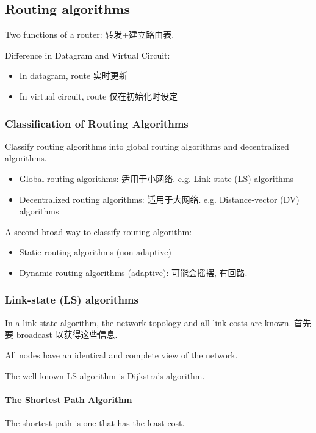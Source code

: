 \subsection{Routing algorithms}
Two functions of a router: 转发+建立路由表. 

Difference in Datagram and Virtual Circuit:
\begin{itemize}
    \item In datagram, route 实时更新
    \item In virtual circuit, route  仅在初始化时设定
\end{itemize}

\subsubsection{Classification of Routing Algorithms}
Classify routing algorithms into global routing algorithms and decentralized algorithms.
\begin{itemize}
    \item Global routing algorithms: 适用于小网络. e.g. Link-state (LS) algorithms
    \item Decentralized routing algorithms: 适用于大网络. e.g. Distance-vector (DV) algorithms
\end{itemize}

A second broad way to classify routing algorithm:
\begin{itemize}
    \item Static routing algorithms (non-adaptive)
    \item Dynamic routing algorithms (adaptive): 可能会摇摆, 有回路. 
\end{itemize}


\subsubsection{Link-state (LS) algorithms}
In a link-state algorithm, the network topology and all link costs
are known. 首先要 broadcast 以获得这些信息. 

All nodes have an identical and complete view of the network.

The well-known LS algorithm is Dijkstra's algorithm. 

\paragraph{The Shortest Path Algorithm}The shortest path is one that has the least cost. 

